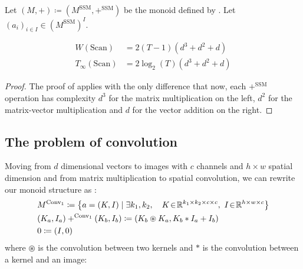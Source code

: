 \begin{proposition}
\label{prop:SSM_complexity}
    Let $(M, +) \coloneqq (M^{\mathrm{SSM}}, +^{\mathrm{SSM}})$ be the monoid defined by . Let $(a_i)_{i\in I}\in (M^{\mathrm{SSM}})^I$.

\begin{align}
    W(\mathrm{Scan})&= 2(T-1)(d^3+d^2+d)\\
    T_\infty(\mathrm{Scan})&= 2\log_2 (T) (d^3+d^2+d)
\end{align}
\end{proposition}

\begin{proof}
The proof of  applies with the only difference that now, each $+^{\mathrm{SSM}}$ operation has complexity $d^3$ for the matrix multiplication on the left, $d^2$ for the matrix-vector multiplication and $d$ for the vector addition on the right.
\end{proof}

\subsection{The problem of convolution}
\label{sec:spatial_ConvSSM}

Moving from $d$ dimensional vectors to images with $c$ channels and $h \times w$ spatial dimension and from matrix multiplication to spatial convolution, we can rewrite our monoid structure as :
\begin{align}
    &M^{\mathrm{Conv}_1}\coloneqq \left\{a = (K, I)\mid \exists k_1, k_2,\quad K\!\in\!\mathbb{R}^{k_1\times k_2\times c\times c},~I\!\in\!\mathbb{R}^{h \times w \times c}\right\}\\
    &(K_a, I_a) +^{\mathrm{Conv}_1} (K_b,I_b)\coloneqq (K_b \circledast K_a, K_b \ast I_a + I_b)\\
    &0\coloneqq(I, 0)
\end{align}
\noindent where $\circledast$ is the convolution between two kernels and $\ast$ is the convolution between a kernel and an image:


